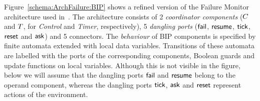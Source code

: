 \documentclass[smallcondensed]{svjour3}
\newcommand{\mdash}{---}
\newcommand{\resp}[1][\ ]{resp.#1}
\newcommand{\goesto}[2][]{\ensuremath{\xrightarrow[#1]{#2}}}
\newcommand{\true}{\ensuremath{\mathit{true}}}
\begin{document}
Figure~\ref{schema:ArchFailure:BIP} shows a refined version of the
Failure Monitor architecture used in~\cite{CubETH-case-study}.
%
The architecture consists of 2 \emph{coordinator components}
($C$ and $T$, for \emph{Control} and \emph{Timer},
respectively), 5 \emph{dangling ports} ($\mathsf{fail}$, $\mathsf{resume}$,
$\mathsf{tick}$, $\mathsf{reset}$ and $\mathsf{ask}$) and 5 connectors.
%
The  \emph{behaviour} of BIP components %
is specified by finite automata extended with
local data variables.  Transitions of these automata are labelled with
the ports of the corresponding components, Boolean guards and update
functions on local variables.  %
Although this is not visible in the figure, below we will assume that
the dangling ports $\mathsf{fail}$ and $\mathsf{resume}$ belong to the operand
component, whereas the dangling ports $\mathsf{tick}$, $\mathsf{ask}$ and
$\mathsf{reset}$ represent actions of the environment.  
\end{document}
